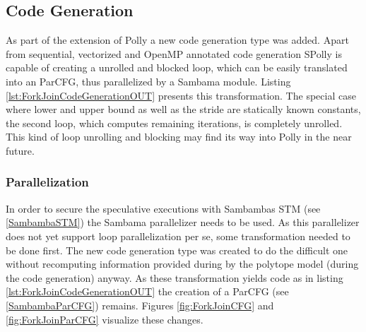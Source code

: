 \orange
\begin{shaded}
\subsection{Code Generation}
As part of the extension of Polly a new code generation type was added. Apart 
from sequential, vectorized and OpenMP annotated code generation SPolly is 
capable of creating a unrolled and blocked loop, which can be easily 
translated into an ParCFG, thus parallelized by a Sambama module. Listing 
\ref{lst:ForkJoinCodeGenerationOUT} presents this transformation. The special 
case where lower and upper bound as well as the 
stride are statically known constants, the second loop, which computes 
remaining iterations, is completely unrolled.
This kind of loop unrolling and blocking may find its 
way into Polly in the near future. 

\subsubsection*{Parallelization}

In order to secure the speculative executions with Sambambas STM
(see \ref{SambambaSTM}) the Sambama parallelizer needs to be used.
As this parallelizer does not yet support loop parallelization per se, some 
transformation needed to be done first. The new code generation type was created
to do the difficult one without recomputing information provided during by the
polytope model (during the code generation) anyway. As these transformation
yields code as in listing \ref{lst:ForkJoinCodeGenerationOUT} the creation of
a ParCFG (see \ref{SambambaParCFG}) remains. Figures \ref{fig:ForkJoinCFG} and
\ref{fig:ForkJoinParCFG} visualize these changes.

\end{shaded}

